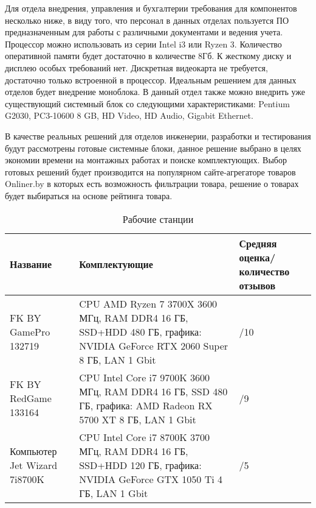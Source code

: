 Для отдела внедрения, управления и бухгалтерии требования для компонентов несколько ниже, в виду того, что персонал в данных отделах пользуется ПО предназначенным для 
работы с различными документами и ведения учета. Процессор можно использовать из серии Intel i3 или Ryzen 3. Количество оперативной 
памяти будет достаточно в количестве 8Гб. К жесткому диску и дисплею особых требований нет. Дискретная видеокарта не требуется, достаточно только встроенной в процессор.
Идеальным решением для данных отделов будет внедрение моноблока.
В данный отдел также можно внедрить уже существующий системный блок со следующими характеристиками: 
Pentium G2030, PC3-10600 8 GB, HD Video, HD Audio, Gigabit Ethernet. 

В качестве реальных решений для отделов инженерии, разработки и тестирования будут рассмотрены готовые системные блоки, данное решение выбрано в целях экономии времени на монтажных работах и поиске комплектующих.
Выбор готовых решений будет производится на популярном сайте-агрегаторе товаров Onliner.by в которых есть возможность фильтрации товара, решение о товарах будет выбираться на основе рейтинга товара.

\begin{table}[ht]
    \caption{Рабочие станции}
    \label{table:func:workStantionsProperty}
    \begin{tabular}{| >{\raggedright}m{}
                    | >{\raggedright\arraybackslash}m{}
                    | >{\raggedright\arraybackslash}m{}|}
        \hline
        \centering Название & \centering\arraybackslash Комплектующие & \centering\arraybackslash Средняя оценка/количество отзывов \\

        \hline
        FK BY GamePro 132719 &
        CPU AMD Ryzen 7 3700X 3600 МГц, RAM DDR4 16 ГБ, SSD+HDD 480 ГБ, графика: NVIDIA GeForce RTX 2060 Super 8 ГБ, LAN 1 Gbit &
        4/10
        \\
        \hline
        FK BY RedGame 133164 &
        CPU Intel Core i7 9700K 3600 МГц, RAM DDR4 16 ГБ, SSD 480 ГБ, графика: AMD Radeon RX 5700 XT 8 ГБ, LAN 1 Gbit &
        5/9
        \\
        \hline
        Компьютер Jet Wizard 7i8700K &
        CPU Intel Core i7 8700K 3700 МГц, RAM DDR4 16 ГБ, SSD+HDD 120 ГБ, графика: NVIDIA GeForce GTX 1050 Ti 4 ГБ, LAN 1 Gbit &
        5/5
        \\
        
        \hline
    \end{tabular}
\end{table}

